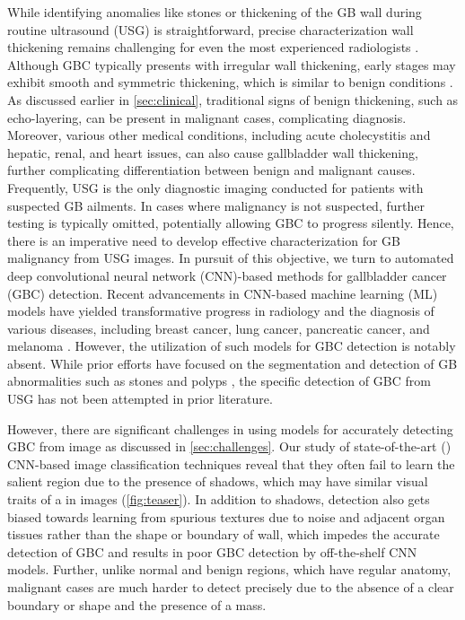 \par While identifying anomalies like stones or thickening of the GB wall during routine ultrasound (USG) is straightforward, precise characterization wall thickening remains challenging for even the most experienced radiologists \cite{gbc-lancet, gb-rads-paper, gupta2020imaging}. Although GBC typically presents with irregular wall thickening, early stages may exhibit smooth and symmetric thickening, which is similar to benign conditions \cite{gupta2020imaging}. As discussed earlier in \cref{sec:clinical}, traditional signs of benign thickening, such as echo-layering, can be present in malignant cases, complicating diagnosis. Moreover, various other medical conditions, including acute cholecystitis and hepatic, renal, and heart issues, can also cause gallbladder wall thickening, further complicating differentiation between benign and malignant causes. Frequently, USG is the only diagnostic imaging conducted for patients with suspected GB ailments. In cases where malignancy is not suspected, further testing is typically omitted, potentially allowing GBC to progress silently. Hence, there is an imperative need to develop effective characterization for GB malignancy from USG images. In pursuit of this objective, we turn to automated deep convolutional neural network (CNN)-based methods for gallbladder cancer (GBC) detection. Recent advancements in CNN-based machine learning (ML) models have yielded transformative progress in radiology and the diagnosis of various diseases, including breast cancer, lung cancer, pancreatic cancer, and melanoma \cite{ardila2019end, bejnordi2017diagnostic, chu2019application, codella2017deep, han2017breast}. However, the utilization of such models for GBC detection is notably absent. While prior efforts have focused on the segmentation and detection of GB abnormalities such as stones and polyps \cite{gbPolyp, gbPolyp2, gbAutomatic}, the specific detection of GBC from USG has not been attempted in prior literature.

\par However, there are significant challenges in using \cnn models for accurately detecting GBC from \usg image as discussed in \cref{sec:challenges}. %
Our study of state-of-the-art (\sota) CNN-based image classification techniques reveal that they often fail to learn the salient \gb region due to the presence of shadows, which may have similar visual traits of a \gb in \usg images (\cref{fig:teaser}). In addition to shadows, \gbc detection also gets biased towards learning from spurious textures due to noise and adjacent organ tissues rather than the shape or boundary of \gb wall, which impedes the accurate detection of GBC and results in poor GBC detection by off-the-shelf CNN models. Further, unlike normal and benign \gb regions, which have regular anatomy, malignant cases are much harder to detect precisely due to the absence of a clear \gb boundary or shape and the presence of a mass. %

